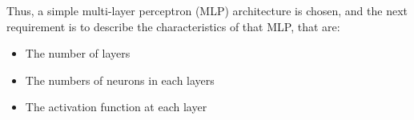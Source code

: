 Thus, a simple multi-layer perceptron (MLP) architecture is chosen, and the next requirement is to describe the characteristics of that MLP, that are:
\begin{itemize}
    \item The number of layers
    \item The numbers of neurons in each layers
    \item The activation function at each layer
\end{itemize}